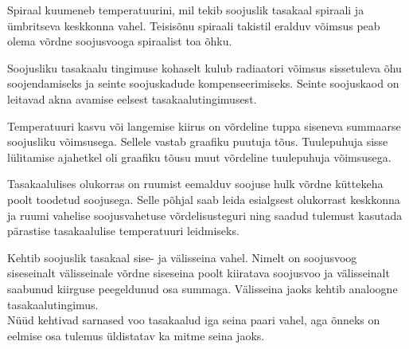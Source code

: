 \documentclass[10pt]{article}
\begin{document}
{%

\hint
Spiraal kuumeneb temperatuurini, mil tekib soojuslik tasakaal spiraali ja ümbritseva keskkonna vahel. Teisisõnu spiraali takistil eralduv võimsus peab olema võrdne soojusvooga spiraalist toa õhku.
\probend
\bigskip


\hint
Soojusliku tasakaalu tingimuse kohaselt kulub radiaatori võimsus sissetuleva õhu soojendamiseks ja seinte soojuskadude kompenseerimiseks. Seinte soojuskaod on leitavad akna avamise eelsest tasakaalutingimusest.
\probend
\bigskip


\hint
Temperatuuri kasvu või langemise kiirus on võrdeline tuppa siseneva summaarse soojusliku võimsusega. Sellele vastab graafiku puutuja tõus. Tuulepuhuja sisse lülitamise ajahetkel oli graafiku tõusu muut võrdeline tuulepuhuja võimsusega.
\probend
\bigskip


\hint
Tasakaalulises olukorras on ruumist eemalduv soojuse hulk võrdne küttekeha poolt toodetud soojusega. Selle põhjal saab leida esialgsest olukorrast keskkonna ja ruumi vahelise soojusvahetuse võrdelisusteguri ning saadud tulemust kasutada pärastise tasakaalulise temperatuuri leidmiseks.
\probend
\bigskip


\hint
\osa Kehtib soojuslik tasakaal sise- ja välisseina vahel. Nimelt on soojusvoog siseseinalt välisseinale võrdne siseseina poolt kiiratava soojusvoo ja välisseinalt saabunud kiirguse peegeldunud osa summaga. Välisseina jaoks kehtib analoogne tasakaalutingimus.\\
\osa Nüüd kehtivad sarnased voo tasakaalud iga seina paari vahel, aga õnneks on eelmise osa tulemus üldistatav ka mitme seina jaoks.
\probend
\bigskip

}
\end{document}
